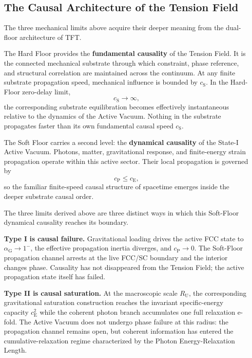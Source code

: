 \subsection{The Causal Architecture of the Tension Field}
\label{sec:causal_architecture_tension_field}

The three mechanical limits above acquire their deeper meaning from the dual-floor architecture of TFT.

The Hard Floor provides the \textbf{fundamental causality} of the Tension Field. It is the connected mechanical substrate through which constraint, phase reference, and structural correlation are maintained across the continuum. At any finite substrate propagation speed, mechanical influence is bounded by $c_{\mathrm S}$. In the Hard-Floor zero-delay limit,
\begin{equation}
    c_{\mathrm S}
    \rightarrow
    \infty,
\end{equation}
the corresponding substrate equilibration becomes effectively instantaneous relative to the dynamics of the Active Vacuum. Nothing in the substrate propagates faster than its own fundamental causal speed $c_{\mathrm S}$.

The Soft Floor carries a second level: the \textbf{dynamical causality} of the State-I Active Vacuum. Photons, matter, gravitational response, and finite-energy strain propagation operate within this active sector. Their local propagation is governed by
\begin{equation}
    c_{\mathrm P}
    \leq
    c_{\mathrm E},
\end{equation}
so the familiar finite-speed causal structure of spacetime emerges inside the deeper substrate causal order.

The three limits derived above are three distinct ways in which this Soft-Floor dynamical causality reaches its boundary.

\textbf{Type I is causal failure.}
Gravitational loading drives the active FCC state to
$\alpha_{\mathrm G}\rightarrow1^{-}$, the effective propagation inertia diverges, and
$c_{\mathrm P}\rightarrow0$. The Soft-Floor propagation channel arrests at the live FCC/SC boundary and the interior changes phase. Causality has not disappeared from the Tension Field; the active propagation state itself has failed.

\textbf{Type II is causal saturation.}
At the macroscopic scale $R_{\mathrm U}$, the corresponding gravitational saturation construction reaches the invariant specific-energy capacity $c_{\mathrm E}^{2}$ while the coherent photon branch accumulates one full relaxation e-fold. The Active Vacuum does not undergo phase failure at this radius: the propagation channel remains open, but coherent information has entered the cumulative-relaxation regime characterized by the Photon Energy-Relaxation Length.

